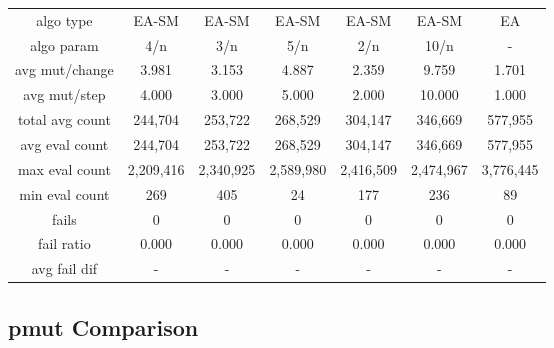 \begin{tabular}[h]{ccccccc}
algo type&               EA-SM&        EA-SM&        EA-SM&        EA-SM&        EA-SM&           EA\\
algo param&                4/n&          3/n&          5/n&          2/n&         10/n&            -\\
avg mut/change&          3.981&        3.153&        4.887&        2.359&        9.759&        1.701\\
avg mut/step&            4.000&        3.000&        5.000&        2.000&       10.000&        1.000\\
\hline
total avg count&       244,704&      253,722&      268,529&      304,147&      346,669&      577,955\\
avg eval count&        244,704&      253,722&      268,529&      304,147&      346,669&      577,955\\
max eval count&      2,209,416&    2,340,925&    2,589,980&    2,416,509&    2,474,967&    3,776,445\\
min eval count&            269&          405&           24&          177&          236&           89\\
\hline
fails&                       0&            0&            0&            0&            0&            0\\
fail ratio&              0.000&        0.000&        0.000&        0.000&        0.000&        0.000\\
avg fail dif&                -&            -&            -&            -&            -&            -\\
\end{tabular}


\subsection{pmut Comparison}


